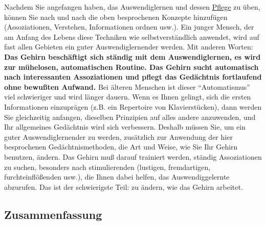 Nachdem Sie angefangen haben, das Auswendiglernen und dessen \hyperref[c1iii6k]{Pflege} zu üben, können Sie nach und nach die oben besprochenen Konzepte hinzufügen (Assoziationen, Verstehen, Informationen ordnen usw.).
Ein junger Mensch, der am Anfang des Lebens diese Techniken wie selbstverständlich anwendet, wird auf fast allen Gebieten ein guter Auswendiglernender werden.
Mit anderen Worten: \textbf{Das Gehirn beschäftigt sich ständig mit dem Auswendiglernen, es wird zur mühelosen, automatischen Routine.
Das Gehirn sucht automatisch nach interessanten Assoziationen und pflegt das Gedächtnis fortlaufend ohne bewußten Aufwand.}
Bei älteren Menschen ist dieser \enquote{Automatismus} viel schwieriger und wird länger dauern.
Wenn es Ihnen gelingt, sich die ersten Informationen einzuprägen (z.B. ein Repertoire von Klavierstücken), dann werden Sie gleichzeitig anfangen, dieselben Prinzipien auf alles andere anzuwenden, und Ihr allgemeines Gedächtnis wird sich verbessern.
Deshalb müssen Sie, um ein guter Auswendiglernender zu werden, zusätzlich zur Anwendung der hier besprochenen Gedächtnismethoden, die Art und Weise, wie Sie Ihr Gehirn benutzen, ändern.
Das Gehirn muß darauf trainiert werden, ständig Assoziationen zu suchen, besonders nach stimulierenden (lustigen, fremdartigen, furchteinflößenden usw.), die Ihnen dabei helfen, das Auswendiggelernte abzurufen.
Das ist der schwierigste Teil: zu ändern, wie das Gehirn arbeitet.


\subsection{Zusammenfassung}
\label{c1iii6o} 

